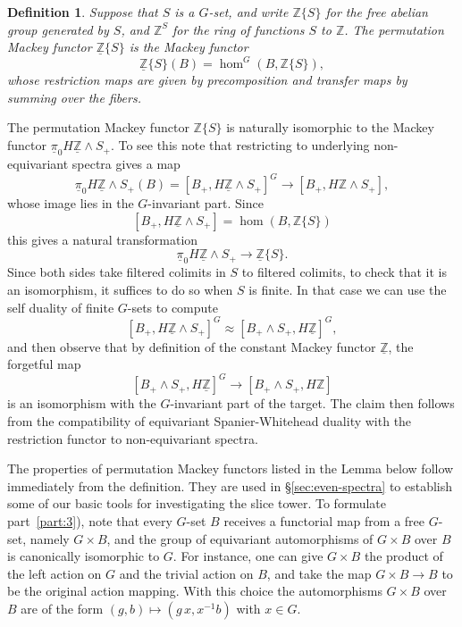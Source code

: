 \documentclass{amsart}
\newtheorem{definition}[equation]{Definition}
\newenvironment{defin}{\begin{definition}\rm}{\end{definition}}
\theoremstyle{definition}
\newtheorem{defin}[equation]{Definition}
\theoremstyle{remark}
\newcommand{\Z}{{\mathbb Z}}
\newcounter{thmItem}
\newcommand{\thmItemref}[1]
 	 {{\rm \ref{#1})}}
\newcommand{\pim}{\underline{\pi}}
\newcommand{\Zm}{\underline{\Z}}
\begin{document}
\begin{defin}
\label{def:23} Suppose that $S$ is a $G$-set, and write $\Z\{S \}$ for
the free abelian group generated by $S$, and $\Z^{S}$ for the ring of
functions $S$ to $\Z$.  The {\em permutation Mackey functor}
$\Zm\{S\}$ is the Mackey functor
\[
\Zm\{S\}(B)=\hom^{G}(B,\Z\{S\}),
\]
whose restriction maps are given by precomposition and transfer maps by
summing over the fibers.   
\end{defin}

The permutation Mackey functor $\Z\{S \}$ is naturally isomorphic to
the Mackey functor $\pim_{0}H\Zm\wedge S_{+}$.   To see this note that 
restricting to underlying non-equivariant spectra gives a map
\[
\pim_{0}H\Zm\wedge S_{+}(B) = [B_{+},H\Zm\wedge S_{+}]^{G}
\to [B_{+},H\Z\wedge S_{+}],
\]
whose image lies in the $G$-invariant part.   Since
\[
[B_{+},H\Zm\wedge S_{+}]  = \hom(B,\Z\{S \})
\]
this gives a natural transformation 
\[
\pim_{0} H\Zm\wedge S_{+}\to \Zm\{S \}.
\]
Since both sides take filtered colimits in $S$ to filtered colimits,
to check that it is an isomorphism, it suffices to do so when $S$ is
finite.  In that case we can use the self duality of finite
$G$-sets to compute
\[
[B_{+},H\Zm\wedge S_{+}]^{G} \approx [B_{+}\wedge S_{+},H\Zm]^{G},
\]
and then observe that by definition of the constant Mackey functor
$\Zm$, the forgetful map
\[
[B_{+}\wedge S_{+},H\Zm]^{G} \to 
[B_{+}\wedge S_{+},H\Z]
\]
is an isomorphism with the $G$-invariant part of the target.  The
claim then follows from the compatibility of equivariant
Spanier-Whitehead duality with the restriction functor to
non-equivariant spectra.  

The properties of permutation Mackey functors listed in the Lemma
below follow immediately from the definition.  They are used in
\S\ref{sec:even-spectra} to establish some of our basic tools for
investigating the slice tower.  To formulate part~\thmItemref{part:3}, note that
every $G$-set $B$ receives a functorial map from a free $G$-set,
namely $G\times B$, and the group of equivariant automorphisms of
$G\times B$ over $B$ is canonically isomorphic to $G$.  For instance,
one can give $G\times B$ the product of the left action on $G$ and the
trivial action on $B$, and take the map $G\times B\to B$ to be the
original action mapping.  With this choice the automorphisms $G\times
B$ over $B$ are of the form $(g,b)\mapsto (g\,x, x^{-1}b)$ with $x\in
G$.
\end{document}

